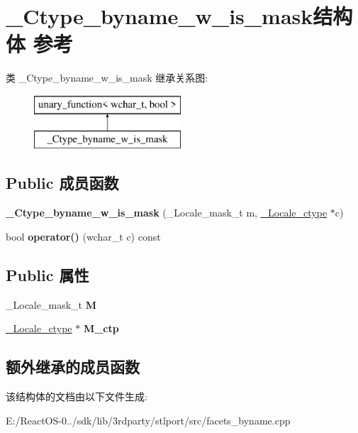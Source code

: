 \hypertarget{struct___ctype__byname__w__is__mask}{}\section{\+\_\+\+Ctype\+\_\+byname\+\_\+w\+\_\+is\+\_\+mask结构体 参考}
\label{struct___ctype__byname__w__is__mask}
类 \+\_\+\+Ctype\+\_\+byname\+\_\+w\+\_\+is\+\_\+mask 继承关系图\+:\begin{figure}[H]
\begin{center}
\leavevmode
\includegraphics[height=2.000000cm]{struct___ctype__byname__w__is__mask}
\end{center}
\end{figure}
\subsection*{Public 成员函数}
\begin{DoxyCompactItemize}
\item 
\mbox{\label{struct___ctype__byname__w__is__mask_a53bfc0f979e7897b3d0fdcaa86aaecd1}} 
{\bfseries \+\_\+\+Ctype\+\_\+byname\+\_\+w\+\_\+is\+\_\+mask} (\+\_\+\+Locale\+\_\+mask\+\_\+t m, \hyperlink{struct___locale__ctype}{\+\_\+\+Locale\+\_\+ctype} $\ast$c)
\item 
\mbox{\label{struct___ctype__byname__w__is__mask_ae53a79fe4a9a84f7593670163abf28c2}} 
bool {\bfseries operator()} (wchar\+\_\+t c) const
\end{DoxyCompactItemize}
\subsection*{Public 属性}
\begin{DoxyCompactItemize}
\item 
\mbox{\label{struct___ctype__byname__w__is__mask_acd63e589651f3f8302f2bedc95b03882}} 
\+\_\+\+Locale\+\_\+mask\+\_\+t {\bfseries M}
\item 
\mbox{\label{struct___ctype__byname__w__is__mask_ac0f2d386ee8d6528e4d5fed33da472ae}} 
\hyperlink{struct___locale__ctype}{\+\_\+\+Locale\+\_\+ctype} $\ast$ {\bfseries M\+\_\+ctp}
\end{DoxyCompactItemize}
\subsection*{额外继承的成员函数}


该结构体的文档由以下文件生成\+:\begin{DoxyCompactItemize}
\item 
E\+:/\+React\+O\+S-\/0../sdk/lib/3rdparty/stlport/src/facets\+\_\+byname.\+cpp\end{DoxyCompactItemize}
